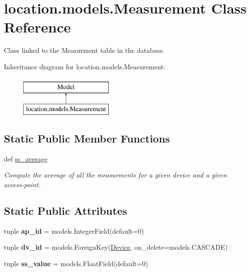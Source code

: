 \hypertarget{classlocation_1_1models_1_1Measurement}{\section{location.\-models.\-Measurement Class Reference}
\label{classlocation_1_1models_1_1Measurement}
}


Class linked to the Measurment table in the database.  


Inheritance diagram for location.\-models.\-Measurement\-:\begin{figure}[H]
\begin{center}
\leavevmode
\includegraphics[height=2.000000cm]{classlocation_1_1models_1_1Measurement}
\end{center}
\end{figure}
\subsection*{Static Public Member Functions}
\begin{DoxyCompactItemize}
\item 
def \hyperlink{classlocation_1_1models_1_1Measurement_a763d73da289bc8117bdbded89c80a12f}{ss\-\_\-average}
\begin{DoxyCompactList}\small\item\em Compute the average of all the measurments for a given device and a given access-\/point. \end{DoxyCompactList}\end{DoxyCompactItemize}
\subsection*{Static Public Attributes}
\begin{DoxyCompactItemize}
\item 
\hypertarget{classlocation_1_1models_1_1Measurement_a6e9937292430758f3c99f0a8ee641ecc}{tuple {\bfseries ap\-\_\-id} = models.\-Integer\-Field(default=0)}\label{classlocation_1_1models_1_1Measurement_a6e9937292430758f3c99f0a8ee641ecc}

\item 
\hypertarget{classlocation_1_1models_1_1Measurement_a566d8eb7ccdca69a0bcfb600572dcb2f}{tuple {\bfseries dv\-\_\-id} = models.\-Foreign\-Key(\hyperlink{classlocation_1_1models_1_1Device}{Device}, on\-\_\-delete=models.\-C\-A\-S\-C\-A\-D\-E)}\label{classlocation_1_1models_1_1Measurement_a566d8eb7ccdca69a0bcfb600572dcb2f}

\item 
\hypertarget{classlocation_1_1models_1_1Measurement_a51b46b31cf97b48211bf482e24c05884}{tuple {\bfseries ss\-\_\-value} = models.\-Float\-Field(default=0)}\label{classlocation_1_1models_1_1Measurement_a51b46b31cf97b48211bf482e24c05884}

\end{DoxyCompactItemize}


